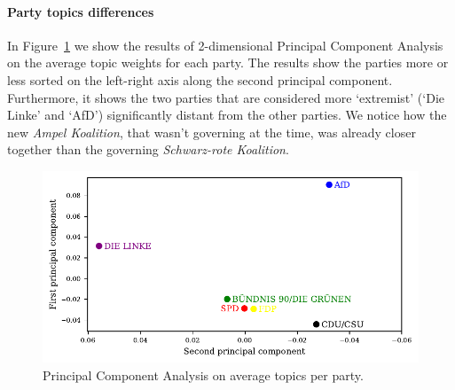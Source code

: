 \documentclass{article}
\begin{document}
\paragraph{Party topics differences}
In Figure~\ref{pca_plot} we show the results of 2-dimensional Principal Component Analysis on the average topic weights for each party.
The results show the parties more or less sorted on the left-right axis along the second principal component.
Furthermore, it shows the two parties that are considered more `extremist' (`Die Linke' and `AfD') significantly distant from the other parties.
We notice how the new \textit{Ampel Koalition}, that wasn't governing at the time, was already closer together than the governing \textit{Schwarz-rote Koalition}.

\begin{figure}
  \centering
  \includegraphics[width=0.9\linewidth]{images/pca.pdf}
  \captionsetup{width=0.9\linewidth}
  \caption{
    Principal Component Analysis on average topics per party.
  }
  \label{pca_plot}
\end{figure}
\end{document}
